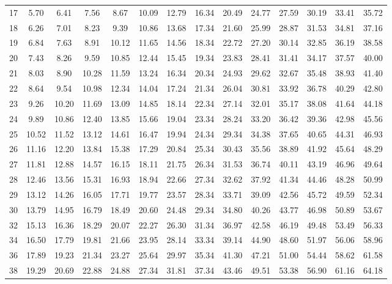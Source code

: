\begin{center}
\begin{tabular}{c | c c c c c c c c c c c c c}
17 & 5.70 & 6.41 & 7.56 & 8.67 & 10.09 & 12.79 & 16.34 & 20.49 & 24.77 & 27.59 & 30.19 & 33.41 & 35.72 \\
18 & 6.26 & 7.01 & 8.23 & 9.39 & 10.86 & 13.68 & 17.34 & 21.60 & 25.99 & 28.87 & 31.53 & 34.81 & 37.16 \\
19 & 6.84 & 7.63 & 8.91 & 10.12 & 11.65 & 14.56 & 18.34 & 22.72 & 27.20 & 30.14 & 32.85 & 36.19 & 38.58 \\
20 & 7.43 & 8.26 & 9.59 & 10.85 & 12.44 & 15.45 & 19.34 & 23.83 & 28.41 & 31.41 & 34.17 & 37.57 & 40.00 \\
21 & 8.03 & 8.90 & 10.28 & 11.59 & 13.24 & 16.34 & 20.34 & 24.93 & 29.62 & 32.67 & 35.48 & 38.93 & 41.40 \\
22 & 8.64 & 9.54 & 10.98 & 12.34 & 14.04 & 17.24 & 21.34 & 26.04 & 30.81 & 33.92 & 36.78 & 40.29 & 42.80 \\
23 & 9.26 & 10.20 & 11.69 & 13.09 & 14.85 & 18.14 & 22.34 & 27.14 & 32.01 & 35.17 & 38.08 & 41.64 & 44.18 \\
24 & 9.89 & 10.86 & 12.40 & 13.85 & 15.66 & 19.04 & 23.34 & 28.24 & 33.20 & 36.42 & 39.36 & 42.98 & 45.56 \\
25 & 10.52 & 11.52 & 13.12 & 14.61 & 16.47 & 19.94 & 24.34 & 29.34 & 34.38 & 37.65 & 40.65 & 44.31 & 46.93 \\
26 & 11.16 & 12.20 & 13.84 & 15.38 & 17.29 & 20.84 & 25.34 & 30.43 & 35.56 & 38.89 & 41.92 & 45.64 & 48.29 \\
27 & 11.81 & 12.88 & 14.57 & 16.15 & 18.11 & 21.75 & 26.34 & 31.53 & 36.74 & 40.11 & 43.19 & 46.96 & 49.64 \\
28 & 12.46 & 13.56 & 15.31 & 16.93 & 18.94 & 22.66 & 27.34 & 32.62 & 37.92 & 41.34 & 44.46 & 48.28 & 50.99 \\
29 & 13.12 & 14.26 & 16.05 & 17.71 & 19.77 & 23.57 & 28.34 & 33.71 & 39.09 & 42.56 & 45.72 & 49.59 & 52.34 \\
30 & 13.79 & 14.95 & 16.79 & 18.49 & 20.60 & 24.48 & 29.34 & 34.80 & 40.26 & 43.77 & 46.98 & 50.89 & 53.67 \\
32 & 15.13 & 16.36 & 18.29 & 20.07 & 22.27 & 26.30 & 31.34 & 36.97 & 42.58 & 46.19 & 49.48 & 53.49 & 56.33 \\
34 & 16.50 & 17.79 & 19.81 & 21.66 & 23.95 & 28.14 & 33.34 & 39.14 & 44.90 & 48.60 & 51.97 & 56.06 & 58.96 \\
36 & 17.89 & 19.23 & 21.34 & 23.27 & 25.64 & 29.97 & 35.34 & 41.30 & 47.21 & 51.00 & 54.44 & 58.62 & 61.58 \\
38 & 19.29 & 20.69 & 22.88 & 24.88 & 27.34 & 31.81 & 37.34 & 43.46 & 49.51 & 53.38 & 56.90 & 61.16 & 64.18 \\

\end{tabular}
\end{center}
